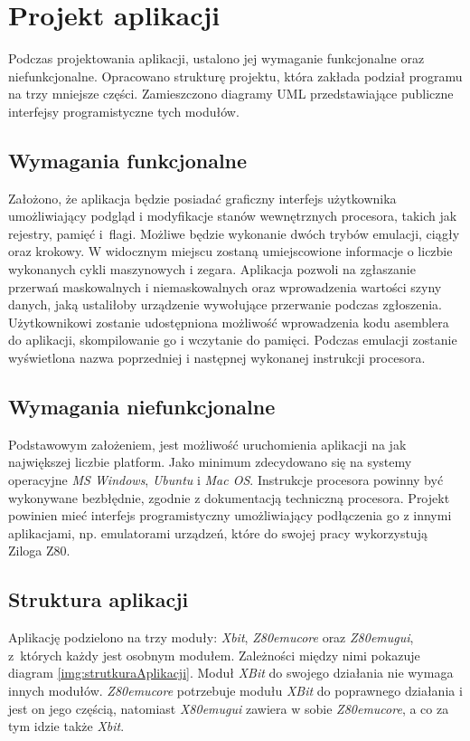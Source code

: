 \chapter{Projekt aplikacji}
	Podczas projektowania aplikacji, ustalono jej wymaganie funkcjonalne oraz niefunkcjonalne. Opracowano strukturę projektu, która zakłada podział programu na trzy mniejsze części. Zamieszczono diagramy UML przedstawiające publiczne interfejsy programistyczne tych modułów.
	
	\section{Wymagania funkcjonalne}
	Założono, że aplikacja będzie posiadać graficzny interfejs użytkownika umożliwiający podgląd i modyfikacje stanów wewnętrznych procesora, takich jak rejestry, pamięć i~flagi. Możliwe będzie wykonanie dwóch trybów emulacji, ciągły oraz krokowy. 
	W widocznym miejscu zostaną umiejscowione informacje o liczbie wykonanych cykli maszynowych i zegara.
	Aplikacja pozwoli na zgłaszanie przerwań maskowalnych i niemaskowalnych oraz wprowadzenia wartości szyny danych, jaką ustaliłoby urządzenie wywołujące przerwanie podczas zgłoszenia. 
	Użytkownikowi zostanie udostępniona możliwość wprowadzenia kodu asemblera do aplikacji, skompilowanie go i wczytanie do pamięci. Podczas emulacji zostanie wyświetlona nazwa poprzedniej i następnej wykonanej instrukcji procesora.

	\section{Wymagania niefunkcjonalne}
	Podstawowym założeniem, jest możliwość uruchomienia aplikacji na jak największej liczbie platform. Jako minimum zdecydowano się na systemy operacyjne \emph{MS Windows}, \emph{Ubuntu} i \emph{Mac OS}. Instrukcje procesora powinny być wykonywane bezbłędnie, zgodnie z dokumentacją techniczną procesora. Projekt powinien mieć interfejs programistyczny umożliwiający podłączenia go z innymi aplikacjami, np. emulatorami urządzeń, które do swojej pracy wykorzystują Ziloga Z80.
	
	\section{Struktura aplikacji}
	Aplikację podzielono na trzy moduły: \emph{Xbit}, \emph{Z80emu{\dywiz}core} oraz \emph{Z80emu{\dywiz}gui}, z~których każdy jest osobnym modułem. Zależności między nimi pokazuje diagram \ref{img:strutkuraAplikacji}. Moduł \emph{XBit} do swojego działania nie wymaga innych modułów. \emph{Z80emu{\dywiz}core} potrzebuje modułu \emph{XBit} do poprawnego działania i jest on jego częścią, natomiast \emph{X80emu{\dywiz}gui} zawiera w sobie \emph{Z80emu{\dywiz}core}, a co za tym idzie także \emph{Xbit}.
    
